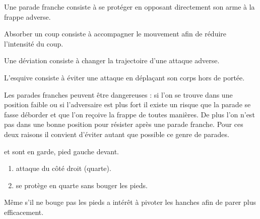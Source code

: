 \begin{definition}

Une parade franche consiste à se protéger en opposant directement son arme à la frappe adverse.

\end{definition}


\begin{definition}[Absorption]

Absorber un coup consiste à accompagner le mouvement afin de réduire l'intensité du coup.

\end{definition}


\begin{definition}[Déviation]

Une déviation consiste à changer la trajectoire d'une attaque adverse.

\end{definition}


\begin{definition}[Esquive]

L'esquive consiste à éviter une attaque en déplaçant son corps hors de portée.

\end{definition}


Les parades franches peuvent être dangereuses : si l'on se trouve dans une position faible ou si l'adversaire est plus fort il existe un risque que la parade se fasse déborder et que l'on reçoive la frappe de toutes manières.
De plus l'on n'est pas dans une bonne position pour résister après une parade franche.
Pour ces deux raisons il convient d'éviter autant que possible ce genre de parades.


\begin{exercice}

\A et \D sont en garde, pied gauche devant.

\begin{enumerate}
	\item \A attaque \D du côté droit (quarte).
	
	\item \D se protège en quarte sans bouger les pieds.
\end{enumerate}

Même s'il ne bouge pas les pieds \D a intérêt à pivoter les hanches afin de parer plus efficacement.

\end{exercice}


